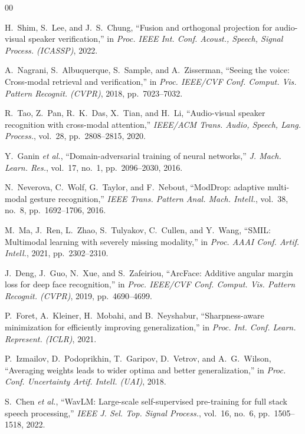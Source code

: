 \documentclass[conference]{IEEEtran}
\begin{document}
\begin{thebibliography}{00}

H.~Shim, S.~Lee, and J.~S.~Chung,
``Fusion and orthogonal projection for audio-visual speaker verification,''
in \emph{Proc. IEEE Int. Conf. Acoust., Speech, Signal Process. (ICASSP)}, 2022.

A.~Nagrani, S.~Albuquerque, S.~Sample, and A.~Zisserman,
``Seeing the voice: Cross-modal retrieval and verification,''
in \emph{Proc. IEEE/CVF Conf. Comput. Vis. Pattern Recognit. (CVPR)},
2018, pp.~7023--7032.

R.~Tao, Z.~Pan, R.~K.~Das, X.~Tian, and H.~Li,
``Audio-visual speaker recognition with cross-modal attention,''
\emph{IEEE/ACM Trans. Audio, Speech, Lang. Process.},
vol.~28, pp.~2808--2815, 2020.

Y.~Ganin \emph{et al.},
``Domain-adversarial training of neural networks,''
\emph{J. Mach. Learn. Res.}, vol.~17, no.~1, pp.~2096--2030, 2016.

N.~Neverova, C.~Wolf, G.~Taylor, and F.~Nebout,
``ModDrop: adaptive multi-modal gesture recognition,''
\emph{IEEE Trans. Pattern Anal. Mach. Intell.}, vol.~38, no.~8,
pp.~1692--1706, 2016.

M.~Ma, J.~Ren, L.~Zhao, S.~Tulyakov, C.~Cullen, and Y.~Wang,
``SMIL: Multimodal learning with severely missing modality,''
in \emph{Proc. AAAI Conf. Artif. Intell.}, 2021, pp.~2302--2310.

J.~Deng, J.~Guo, N.~Xue, and S.~Zafeiriou,
``ArcFace: Additive angular margin loss for deep face recognition,''
in \emph{Proc. IEEE/CVF Conf. Comput. Vis. Pattern Recognit. (CVPR)},
2019, pp.~4690--4699.

P.~Foret, A.~Kleiner, H.~Mobahi, and B.~Neyshabur,
``Sharpness-aware minimization for efficiently improving generalization,''
in \emph{Proc. Int. Conf. Learn. Represent. (ICLR)}, 2021.

P.~Izmailov, D.~Podoprikhin, T.~Garipov, D.~Vetrov, and A.~G.~Wilson,
``Averaging weights leads to wider optima and better generalization,''
in \emph{Proc. Conf. Uncertainty Artif. Intell. (UAI)}, 2018.

S.~Chen \emph{et al.},
``WavLM: Large-scale self-supervised pre-training for full stack speech processing,''
\emph{IEEE J. Sel. Top. Signal Process.}, vol.~16, no.~6,
pp.~1505--1518, 2022.


\end{thebibliography}
\end{document}
